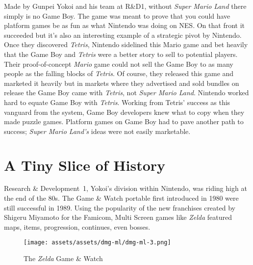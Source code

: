 \documentclass{book}
\begin{document}
Made by Gunpei Yokoi and his team at R\&D1, without \emph{Super Mario Land} there simply is no Game Boy. The game was meant to prove that you could have platform games be as fun as what Nintendo was doing on NES. On that front it succeeded but it’s also an interesting example of a strategic pivot by Nintendo. Once they discovered \emph{Tetris}, Nintendo sidelined this Mario game and bet heavily that the Game Boy and \emph{Tetris} were a better story to sell to potential players. Their proof-of-concept \emph{Mario} game could not sell the Game Boy to as many people as the falling blocks of \emph{Tetris}. Of course, they released this game and marketed it heavily but in markets where they advertised and sold bundles on release the Game Boy came with \emph{Tetris}, not \emph{Super Mario Land}. Nintendo worked hard to equate Game Boy with \emph{Tetris}. Working from Tetris’ success as this vanguard from the system, Game Boy developers knew what to copy when they made puzzle games. Platform games on Game Boy had to pave another path to success; \emph{Super Mario Land’s} ideas were not easily marketable.

\FloatBarrier\needspace{10mm}\section*{A Tiny Slice of History}\nopagebreak[4]

Research \& Development~1, Yokoi’s division within Nintendo, was riding high at the end of the 80s. The Game \& Watch portable first introduced in 1980 were still successful in 1989. Using the popularity of the new franchises created by Shigeru Miyamoto for the Famicom, Multi Screen games like \emph{Zelda} featured maps, items, progression, continues, even bosses.

\begin{figure}[hbt]
\vskip 10pt
\centering \texttt{[image: assets/assets/dmg-ml/dmg-ml-3.png]}\par\pagetwodescription The \emph{Zelda} Game \& Watch
\vskip 6pt
\end{figure}
\end{document}

